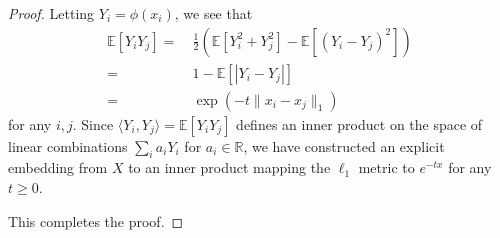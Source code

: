 \begin{proof}
Letting $Y_i=\phi(x_i)$, we see that 
\begin{align*}
\mathbb E[Y_iY_j]
= & ~ \frac{1}{2}\left(\mathbb E[Y_i^2+Y_j^2]-\mathbb E[(Y_i-Y_j)^2]\right)\\
= & ~ 1-\mathbb E[ | Y_i - Y_j | ] \\
= & ~ \exp( - t \| x_i - x_j \|_1 )
\end{align*}
for any $i,j$. Since $\langle Y_i,Y_j\rangle = \mathbb E[Y_i Y_j]$ defines an inner product on the space of linear combinations $\sum_i a_iY_i$ for $a_i \in \mathbb{R}$, we have constructed an explicit embedding from $X$ to an inner product mapping the $\ell_1$ metric to $e^{-tx}$ for any $t\geq 0$. 

This completes the proof.
\fi


\end{proof}






